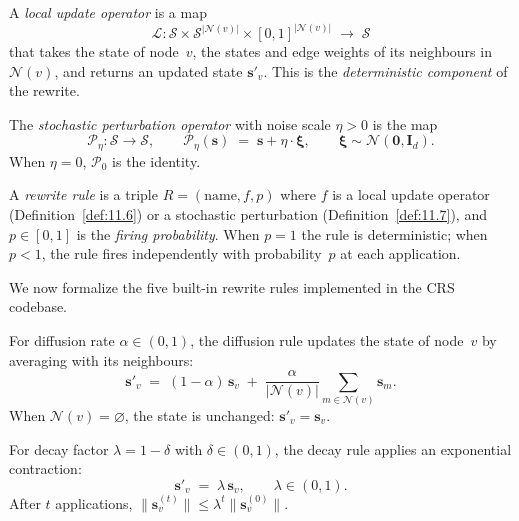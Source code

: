 \begin{definition}
\label{def:11.6}
A \emph{local update operator} is a map
\[
  \mathcal{L} \colon \mathcal{S} \times \mathcal{S}^{|\mathcal{N}(v)|}
  \times [0,1]^{|\mathcal{N}(v)|}
  \;\longrightarrow\; \mathcal{S}
\]
that takes the state of node~$v$, the states and edge weights of its
neighbours in $\mathcal{N}(v)$, and returns an updated state
$\mathbf{s}'_v$.  This is the \emph{deterministic component} of
the rewrite.
\end{definition}

\begin{definition}
\label{def:11.7}
The \emph{stochastic perturbation operator} with noise scale
$\eta > 0$ is the map
\[
  \mathcal{P}_\eta \colon \mathcal{S} \to \mathcal{S},
  \qquad
  \mathcal{P}_\eta(\mathbf{s}) \;=\; \mathbf{s} + \eta \cdot \boldsymbol{\xi},
  \qquad
  \boldsymbol{\xi} \sim \mathcal{N}(\mathbf{0}, \mathbf{I}_d).
\]
When $\eta = 0$, $\mathcal{P}_0$ is the identity.
\end{definition}

\begin{definition}
\label{def:11.8}
A \emph{rewrite rule} is a triple $R = (\mathrm{name}, f, p)$ where
$f$ is a local update operator (Definition~\ref{def:11.6}) or a
stochastic perturbation (Definition~\ref{def:11.7}), and
$p \in [0,1]$ is the \emph{firing probability}.  When $p = 1$ the
rule is deterministic; when $p < 1$, the rule fires independently
with probability~$p$ at each application.
\end{definition}

We now formalize the five built-in rewrite rules implemented in the
CRS codebase.

\begin{definition}
\label{def:11.9}
For diffusion rate $\alpha \in (0,1)$, the diffusion rule updates the
state of node~$v$ by averaging with its neighbours:
\begin{equation}
\label{eq:11.diffusion}
  \mathbf{s}'_v \;=\;
  (1 - \alpha)\,\mathbf{s}_v
  \;+\;
  \frac{\alpha}{|\mathcal{N}(v)|}
  \sum_{m \in \mathcal{N}(v)} \mathbf{s}_m.
\end{equation}
When $\mathcal{N}(v) = \varnothing$, the state is unchanged:
$\mathbf{s}'_v = \mathbf{s}_v$.
\end{definition}

\begin{definition}
\label{def:11.10}
For decay factor $\lambda = 1 - \delta$ with
$\delta \in (0,1)$, the decay rule applies an exponential contraction:
\begin{equation}
\label{eq:11.decay}
  \mathbf{s}'_v \;=\; \lambda \, \mathbf{s}_v,
  \qquad \lambda \in (0,1).
\end{equation}
After $t$ applications,
$\|\mathbf{s}^{(t)}_v\| \leq \lambda^t \|\mathbf{s}^{(0)}_v\|$.
\end{definition}

